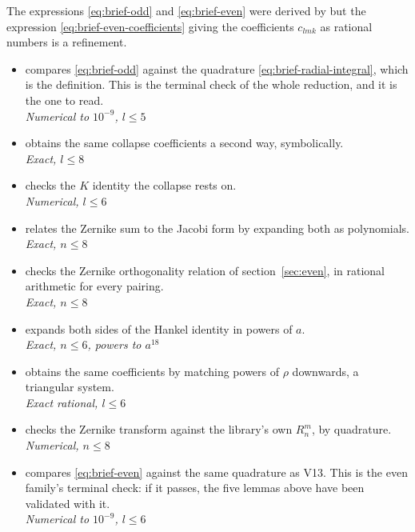 The expressions \eqref{eq:brief-odd} and \eqref{eq:brief-even}
were derived by \cite{dholakia2025} but the
expression \eqref{eq:brief-even-coefficients} giving the
coefficients $c_{lmk}$ as rational numbers is a refinement.


\begin{itemize}
  \item[$\checkmark$]  compares \eqref{eq:brief-odd} against the
    quadrature \eqref{eq:brief-radial-integral}, which is the definition.  This is the terminal
    check of the whole reduction, and it is the one to read.
    \\[1pt] \quad \emph{Numerical to $10^{-9}$, $l \le 5$}
  \item[$\checkmark$]  obtains the same collapse coefficients a
    second way, symbolically.
    \\[1pt] \quad \emph{Exact, $l \le 8$}
  \item[$\checkmark$]  checks the $K$ identity the collapse rests on.
    \\[1pt] \quad \emph{Numerical, $l \le 6$}
\end{itemize}

\begin{itemize}
  \item[$\checkmark$]  relates the Zernike sum to the Jacobi form by
    expanding both as polynomials.
    \\[1pt] \quad \emph{Exact, $n \le 8$}
  \item[$\checkmark$]  checks
    the Zernike orthogonality relation of section~\ref{sec:even}, in rational arithmetic for every pairing.
    \\[1pt] \quad \emph{Exact, $n \le 8$}
  \item[$\checkmark$]  expands both sides of the Hankel identity in
    powers of $a$.
    \\[1pt] \quad \emph{Exact, $n \le 6$, powers to $a^{18}$}
  \item[$\checkmark$]  obtains the same coefficients by matching
    powers of $\rho$ downwards, a triangular system.
    \\[1pt] \quad \emph{Exact rational, $l \le 6$}
  \item[$\checkmark$]  checks the Zernike transform against
    the library's own $R_n^m$, by quadrature.
    \\[1pt] \quad \emph{Numerical, $n \le 8$}
  \item[$\checkmark$]  compares \eqref{eq:brief-even} against the
    same quadrature as V13.  This is the even family's terminal check: if it passes, the five
    lemmas above have been validated with it.
    \\[1pt] \quad \emph{Numerical to $10^{-9}$, $l \le 6$}
\end{itemize}

